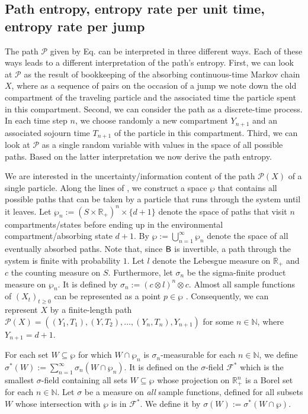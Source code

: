 \documentclass[smallextended]{svjour3}
\makeatletter
\renewcommand*{\eqref}[1]{%
  \hyperref[{#1}]{\textup{\tagform@{\ref*{#1}}}}%
}
\newcommand{\R}{\mathbb{R}}
\newcommand{\N}{\mathbb{N}}
\makeatother
\begin{document}
\subsection{Path entropy, entropy rate per unit time, entropy rate per jump}
\label{sec:path_entropy}
The path $\mathcal{P}$ given by Eq. \eqref{eqn:path} can be interpreted in three different ways.
Each of these ways leads to a different interpretation of the path's entropy.
First, we can look at $\mathcal{P}$ as the result of bookkeeping of the absorbing continuous-time Markov chain $X$, where as a sequence of pairs on the occasion of a jump we note down the old compartment of the traveling particle and the associated time the particle spent in this compartment.
Second, we can consider the path as a discrete-time process.
In each time step $n$, we choose randomly a new compartment $Y_{n+1}$ and an associated sojourn time $T_{n+1}$ of the particle in this compartment.
Third, we can look at $\mathcal{P}$ as a single random variable with values in the space of all possible paths.
Based on the latter interpretation we now derive the path entropy.

We are interested in the uncertainty/information content of the path $\mathcal{P}(X)$ of a single particle.
Along the lines of \citet{Albert1962AMS}, we construct a space $\wp$ that contains all possible paths that can be taken by a particle that runs through the system until it leaves.
Let $\wp_n:=(S\times\R_+)^n\times\{d+1\}$ denote the space of paths that visit $n$ compartments/states before ending up in the environmental compartment/absorbing state $d+1$.
By $\wp:=\bigcup_{n=1}^{\infty}\wp_n$ denote the space of all eventually absorbed paths.
Note that, since $\mathsf{B}$ is invertible, a path through the system is finite with probability $1$.
Let $l$ denote the Lebesgue measure on $\R_+$ and $c$ the counting measure on $S$.
Furthermore, let $\sigma_n$ be the sigma-finite product measure on $\wp_n$.
It is defined by $\sigma_n:=(c\otimes l)^n \otimes c$.
Almost all sample functions of $(X_t)_{t\geq0}$ can be represented as a point $p\in\wp$ \citep[Chapter~VI]{Doob1953}.
Consequently, we can represent $X$ by a finite-length path $\mathcal{P}(X)=((Y_1,T_1),(Y,T_2),\ldots,(Y_n,T_n),Y_{n+1})$ for some $n\in\N$, where $Y_{n+1}=d+1$.

For each set $W\subseteq\wp$ for which $W\cap \wp_n$ is $\sigma_n$-measurable for each $n\in\N$, we define $\sigma^\ast(W) := \sum_{n=1}^{\infty} \sigma_n(W\cap\wp_n)$.
It is defined on the $\sigma$-field $\mathcal{F}^\ast$ which is the smallest $\sigma$-field containing all sets $W\subseteq\wp$ whose projection on $\R^n_+$ is a Borel set for each $n\in\N$.
Let $\sigma$ be a measure on \emph{all} sample functions, defined for all subsets $W$ whose intersection with $\wp$ is in $\mathcal{F}^\ast$. 
We define it by $\sigma(W):=\sigma^*(W\cap\wp)$.
\end{document}
